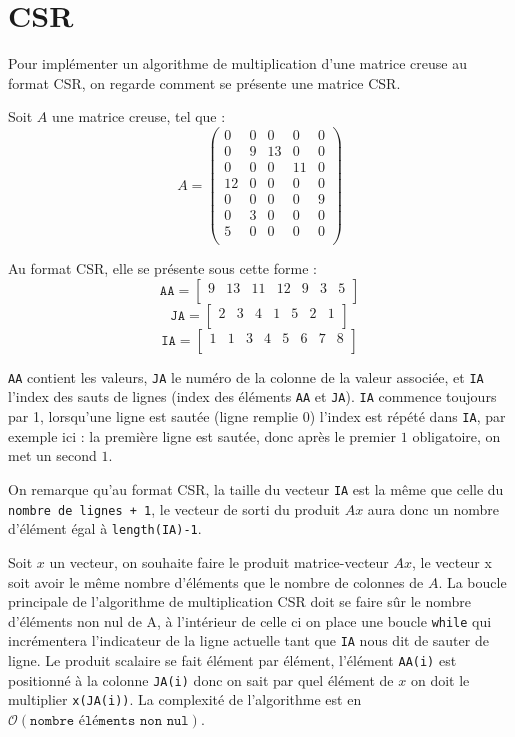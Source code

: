 \documentclass{article}
\begin{document}
\section{CSR}

Pour implémenter un algorithme de multiplication d'une matrice creuse au format CSR, on regarde comment se présente une matrice CSR.

Soit \(A\) une matrice creuse, tel que :
\[
A = 
\begin{pmatrix}
	0	&	0	&	0	&	0	& 0	\\
	0	&	9	&	13	&	0	& 0	\\
	0	&	0	&	0	&	11	& 0	\\
	12	&	0	&	0	&	0	& 0	\\
	0	&	0	&	0	&	0	& 9	\\
	0	&	3	&	0	&	0	& 0	\\
	5	&	0	&	0	&	0	& 0	\\
\end{pmatrix}
\]

Au format CSR, elle se présente sous cette forme :
\[
\texttt{AA}  = 
\begin{bmatrix}
9	&	13	&	11	&	12	&	9	&	3	&	5	\\
\end{bmatrix}
\]
\[
\texttt{JA}  = 
\begin{bmatrix}
2	&	3	&	4	&	1	&	5	&	2	&	1	\\
\end{bmatrix}
\]
\[
\texttt{IA}  = 
\begin{bmatrix}
1	&	1	&	3	&	4	&	5	&	6	&	7	&	8	\\
\end{bmatrix}
\]

\texttt{AA} contient les valeurs, \texttt{JA} le numéro de la colonne de la valeur associée, et \texttt{IA} l'index des sauts de lignes (index des éléments \texttt{AA} et \texttt{JA}). \texttt{IA} commence toujours par 1, lorsqu'une ligne est sautée (ligne remplie 0) l'index est répété dans \texttt{IA}, par exemple ici : la première ligne est sautée, donc après le premier \(1\) obligatoire, on met un second \(1\).

On remarque qu'au format CSR, la taille du vecteur \texttt{IA} est la même que celle du \texttt{nombre de lignes + 1}, le vecteur de sorti du produit \(Ax\) aura donc un nombre d'élément égal à \texttt{length(IA)-1}.

Soit \(x\) un vecteur, on souhaite faire le produit matrice-vecteur \(Ax\), le vecteur x soit avoir le même nombre d'éléments que le nombre de colonnes de \(A\).
La boucle principale de l'algorithme de multiplication CSR doit se faire sûr le nombre d'éléments non nul de A, à l'intérieur de celle ci on place une boucle \texttt{while} qui incrémentera l'indicateur de la ligne actuelle tant que \texttt{IA} nous dit de sauter de ligne. Le produit scalaire se fait élément par élément, l'élément \texttt{AA(i)} est positionné à la colonne \texttt{JA(i)} donc on sait par quel élément de \(x\) on doit le multiplier \texttt{x(JA(i))}. La complexité de l'algorithme est en \(\mathcal{O}(\texttt{nombre\ éléments\ non\ nul})\).
\end{document}
